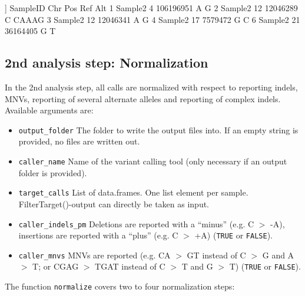 \documentclass{article}
\begin{document}
\begin{Schunk}
\begin{Soutput}
[[2]]
  SampleID Chr       Pos Ref   Alt
1  Sample2   4 106196951   A     G
2  Sample2  12  12046289   C CAAAG
3  Sample2  12  12046341   A     G
4  Sample2  17   7579472   G     C
6  Sample2  21  36164405   G     T
\end{Soutput}
\end{Schunk}


\subsection{2nd analysis step: Normalization}

In the 2nd analysis step, all calls are normalized with respect to reporting indels, MNVs, reporting of several alternate alleles and reporting of complex indels. Available arguments are:

\begin{itemize}
  \item \texttt{output\_folder} The folder to write the output files into. If an empty string is provided, no files are written out.
  \item \texttt{caller\_name} Name of the variant calling tool (only necessary if an output folder is provided).
  \item \texttt{target\_calls} List of data.frames. One list element per sample. FilterTarget()-output can directly be taken as input.
  \item \texttt{caller\_indels\_pm} Deletions are reported with a ``minus'' (e.g. C $>$ -A), insertions are reported with a ``plus'' (e.g. C $>$ +A) (\texttt{TRUE} or \texttt{FALSE}).
  \item \texttt{caller\_mnvs} MNVs are reported (e.g. CA $>$ GT instead of C $>$ G and A $>$ T; or CGAG $>$ TGAT instead of C $>$ T and G $>$ T) (\texttt{TRUE} or \texttt{FALSE}).
\end{itemize}

The function \texttt{normalize} covers two to four normalization steps:
\end{document}
